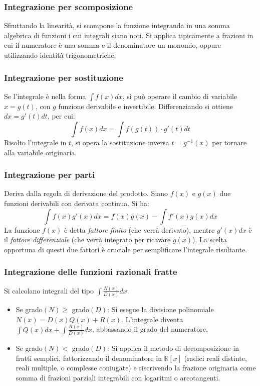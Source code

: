 \subsubsection{Integrazione per scomposizione}
Sfruttando la linearità, si scompone la funzione integranda in una somma algebrica di funzioni i cui integrali siano noti. Si applica tipicamente a frazioni in cui il numeratore è una somma e il denominatore un monomio, oppure utilizzando identità trigonometriche.

\subsubsection{Integrazione per sostituzione}
Se l'integrale è nella forma $\int f(x) dx$, si può operare il cambio di variabile $x = g(t)$, con $g$ funzione derivabile e invertibile. Differenziando si ottiene $dx = g'(t) dt$, per cui:
\[ \int f(x) dx = \int f(g(t)) \cdot g'(t) dt \]
Risolto l'integrale in $t$, si opera la sostituzione inversa $t = g^{-1}(x)$ per tornare alla variabile originaria.

\subsubsection{Integrazione per parti}
Deriva dalla regola di derivazione del prodotto. Siano $f(x)$ e $g(x)$ due funzioni derivabili con derivata continua. Si ha:
\[ \int f(x)g'(x) dx = f(x)g(x) - \int f'(x)g(x) dx \]
La funzione $f(x)$ è detta \textit{fattore finito} (che verrà derivato), mentre $g'(x)dx$ è il \textit{fattore differenziale} (che verrà integrato per ricavare $g(x)$). La scelta opportuna di questi due fattori è cruciale per semplificare l'integrale risultante.

\subsubsection{Integrazione delle funzioni razionali fratte}
Si calcolano integrali del tipo $\int \frac{N(x)}{D(x)} dx$.
\begin{itemize}
    \item Se grado$(N) \ge$ grado$(D)$: Si esegue la divisione polinomiale $N(x) = D(x)Q(x) + R(x)$. L'integrale diventa $\int Q(x) dx + \int \frac{R(x)}{D(x)} dx$, abbassando il grado del numeratore.
    \item Se grado$(N) <$ grado$(D)$: Si applica il metodo di decomposizione in fratti semplici, fattorizzando il denominatore in $\mathbb{R}[x]$ (radici reali distinte, reali multiple, o complesse coniugate) e riscrivendo la frazione originaria come somma di frazioni parziali integrabili con logaritmi o arcotangenti.
\end{itemize}

